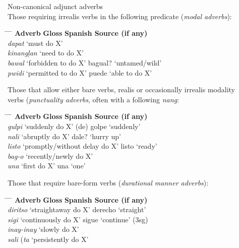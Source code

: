 \ea
\label{bkm:Ref480616640}\label{bkm:Ref441309176}
Non-canonical adjunct adverbs \\
\ea  Those requiring irrealis verbs in the following predicate (\textit{modal adverbs}): \\
\begin{tabbing}
\hspace{2cm} \= \hspace{5cm} \= \hspace{1.65cm} \= \kill
\textbf{Adverb} \>   \textbf{Gloss}   \>       \textbf{Spanish Source (if any)} \\
\textit{dapat}  \>  ‘must do X’ \\
\textit{kinangļan} \> ‘need to do X’ \\
\textit{bawal}  \>  ‘forbidden to do X’ \>     bagual? \> ‘untamed/wild’ \\
\textit{pwidi}  \>  ‘permitted to do X’  \>     puede \> ‘able to do X’ \\
\end{tabbing}
\ex  Those that allow either bare verbs, realis or occasionally irrealis modality \\ verbs (\textit{punctuality adverbs}, often with a following \textit{nang}: \\
\begin{tabbing}
\hspace{2cm} \= \hspace{5cm} \= \hspace{1.65cm} \= \kill
\textbf{Adverb} \>   \textbf{Gloss}   \>       \textbf{Spanish Source (if any)} \\
\textit{gulpi}  \>   ‘suddenly do X’   \>   (de) golpe \> ‘suddenly’ \\
\textit{nali}  \>   ‘abruptly do X’  \>    dale?  \>  ‘hurry up’ \\
\textit{listo} \>  ‘promptly/without delay do X’ \>  listo  \>  ‘ready’ \\
\textit{bag-o}  \>   ‘recently/newly do X’\footnotemark{} \\
\textit{una}  \>   ‘first do X’     \>   una\footnotemark{}  \>  ‘one’ \\
\end{tabbing}
\ex  Those that require bare-form verbs (\textit{durational manner adverbs}): \\
\begin{tabbing}
\hspace{2cm} \= \hspace{5cm} \= \hspace{1.65cm} \= \kill
\textbf{Adverb} \>   \textbf{Gloss}   \>       \textbf{Spanish Source (if any)} \\
\textit{diritso}  \>   ‘straightaway do X’ \>     derecho \>  ‘straight’ \\
\textit{sigi}  \>   ‘continuously do X’   \>   sigue  \>  ‘continue’ (3sg) \\
\textit{inay-inay} \>  ‘slowly do X’ \\
\textit{sali} (\textit{ta} \>‘persistently do X’ \\
\end{tabbing}
